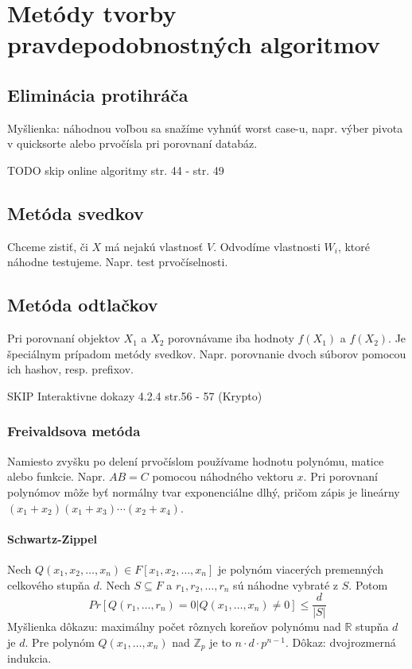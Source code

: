 \documentclass[12pt,a4paper]{article}
\begin{document}
 
\section{Metódy tvorby pravdepodobnostných algoritmov} 
\subsection{Eliminácia protihráča}
Myšlienka: náhodnou voľbou sa snažíme vyhnúť worst case-u, napr. výber pivota v quicksorte alebo prvočísla pri porovnaní databáz. 

TODO skip online algoritmy str. 44 - str. 49 

\subsection{Metóda svedkov}
Chceme zistiť, či $X$ má nejakú vlastnosť $V$. Odvodíme vlastnosti $W_i$, ktoré náhodne testujeme. Napr. test prvočíselnosti. 

\subsection{Metóda odtlačkov} 
Pri porovnaní objektov $X_1$ a $X_2$ porovnávame iba hodnoty $f(X_1)$ a $f(X_2)$. Je špeciálnym prípadom metódy svedkov. Napr. porovnanie dvoch súborov pomocou ich hashov, resp. prefixov. 

SKIP Interaktivne dokazy 4.2.4 str.56 - 57 (Krypto) 

\subsubsection{Freivaldsova metóda}
Namiesto zvyšku po delení prvočíslom používame hodnotu polynómu, matice alebo funkcie. Napr. $AB=C$ pomocou náhodného vektoru $x$. Pri porovnaní polynómov môže byť normálny tvar exponenciálne dlhý, pričom zápis je lineárny $(x_1 + x_2)(x_1 + x_3) \cdots (x_2 + x_4)$. 
\paragraph{Schwartz-Zippel} Nech $Q(x_1, x_2, \ldots, x_n) \in F[x_1, x_2, \ldots, x_n]$ je polynóm viacerých premenných celkového stupňa $d$. Nech $S \subseteq F$ a $r_1, r_2, \ldots, r_n$ sú náhodne vybraté z $S$. Potom 
$$
  Pr[Q(r_1,\ldots,r_n) = 0 | Q(x_1, \ldots, x_n) \neq 0] \leq \frac{d}{|S|}
$$
Myšlienka dôkazu: maximálny počet rôznych koreňov polynómu nad $\mathbb{R}$ stupňa $d$ je $d$. Pre polynóm $Q(x_1, \ldots, x_n)$ nad $\mathbb{Z}_p$ je to $n \cdot d \cdot p^{n-1}$. Dôkaz: dvojrozmerná indukcia. 
\end{document}
